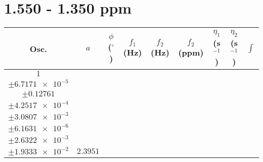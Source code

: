 \documentclass[8pt]{article}
\begin{document}
\section*{1.550 - 1.350 ppm}
\begin{longtable}[l]{c c c c c c c c c}
\toprule
Osc. & $a$ & $\phi$ ($^{\circ}$) & $f_1$ (Hz) & $f_2$ (Hz) & $f_2$ (ppm) & $\eta_1$ (s$^{-1}$) & $\eta_2$ (s$^{-1}$) & $\int$\\
\midrule
$\num{1}$ & \begin{tabular}[c]{@{}c@{}}$\num{3.0558e-2}$ \\ $\pm\num{6.7171e-5}$\end{tabular} & \begin{tabular}[c]{@{}c@{}}$\num{0.17511}$ \\ $\pm\num{0.12761}$\end{tabular} & \begin{tabular}[c]{@{}c@{}}$\num{-9.3665}$ \\ $\pm\num{4.2517e-4}$\end{tabular} & \begin{tabular}[c]{@{}c@{}}$\num{721.32}$ \\ $\pm\num{3.0807e-3}$\end{tabular} & \begin{tabular}[c]{@{}c@{}}$\num{1.443}$ \\ $\pm\num{6.1631e-6}$\end{tabular} & \begin{tabular}[c]{@{}c@{}}$\num{1.1598}$ \\ $\pm\num{2.6322e-3}$\end{tabular} & \begin{tabular}[c]{@{}c@{}}$\num{4.1608}$ \\ $\pm\num{1.9333e-2}$\end{tabular} & $\num{2.3951}$\\

\end{longtable}
\end{document}
